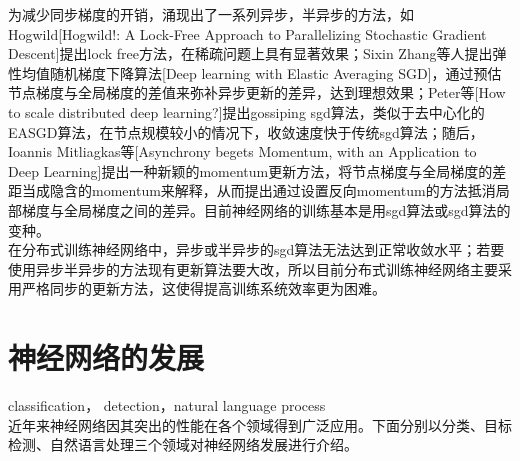 为减少同步梯度的开销，涌现出了一系列异步，半异步的方法，如Hogwild[Hogwild!: A Lock-Free Approach to Parallelizing Stochastic Gradient Descent]提出lock free方法，在稀疏问题上具有显著效果；Sixin Zhang等人提出弹性均值随机梯度下降算法[Deep learning with Elastic Averaging SGD]，通过预估节点梯度与全局梯度的差值来弥补异步更新的差异，达到理想效果；Peter等[How to scale distributed deep learning?]提出gossiping sgd算法，类似于去中心化的EASGD算法，在节点规模较小的情况下，收敛速度快于传统sgd算法；随后，Ioannis Mitliagkas等[Asynchrony begets Momentum, with an Application to Deep Learning]提出一种新颖的momentum更新方法，将节点梯度与全局梯度的差距当成隐含的momentum来解释，从而提出通过设置反向momentum的方法抵消局部梯度与全局梯度之间的差异。目前神经网络的训练基本是用sgd算法或sgd算法的变种。\\
在分布式训练神经网络中，异步或半异步的sgd算法无法达到正常收敛水平；若要使用异步半异步的方法现有更新算法要大改，所以目前分布式训练神经网络主要采用严格同步的更新方法，这使得提高训练系统效率更为困难。
\section{神经网络的发展}
classification， detection，natural language process\\
近年来神经网络因其突出的性能在各个领域得到广泛应用。下面分别以分类、目标检测、自然语言处理三个领域对神经网络发展进行介绍。
